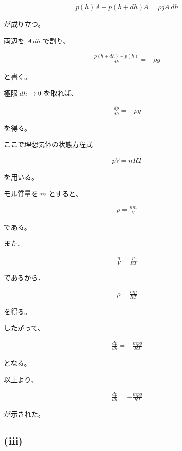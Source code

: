 \documentclass[platex,dvipdfmx,a4paper]{jsarticle}
\begin{document}
\begin{align*}
p(h)A-p(h+dh)A
=
\rho gA\,dh
\end{align*}

が成り立つ。

両辺を $A\,dh$ で割り、

\begin{align*}
\frac{p(h+dh)-p(h)}{dh}
=
-\rho g
\end{align*}

と書く。

極限 $dh\to0$ を取れば、

\begin{align*}
\frac{dp}{dh}
=
-\rho g
\end{align*}

を得る。

ここで理想気体の状態方程式

\begin{align*}
pV=nRT
\end{align*}

を用いる。

モル質量を $m$ とすると、

\begin{align*}
\rho
=
\frac{nm}{V}
\end{align*}

である。

また、

\begin{align*}
\frac{n}{V}
=
\frac{p}{RT}
\end{align*}

であるから、

\begin{align*}
\rho
=
\frac{mp}{RT}
\end{align*}

を得る。

したがって、

\begin{align*}
\frac{dp}{dh}
=
-\frac{mpg}{RT}
\end{align*}

となる。

以上より、

\begin{align*}
\frac{dp}{dh}
=
-\frac{mpg}{RT}
\end{align*}

が示された。

\subsection{(iii)}
\end{document}
